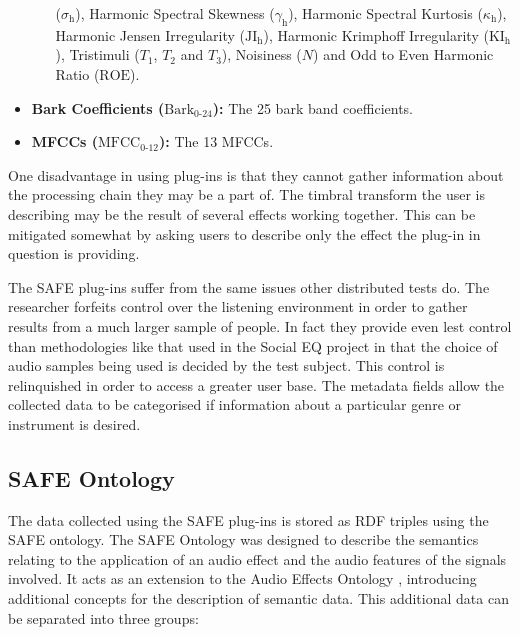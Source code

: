 \begin{itemize}
\begin{itemize}
				      ($\sigma_{\textrm{h}}$), Harmonic Spectral Skewness ($\gamma_{\textrm{h}}$), Harmonic
				      Spectral Kurtosis ($\kappa_{\textrm{h}}$), Harmonic Jensen Irregularity
				      ($\textrm{JI}_{\textrm{h}}$), Harmonic Krimphoff Irregularity
				      ($\textrm{KI}_{\textrm{h}}$), Tristimuli ($T_{1}$, $T_{2}$ and $T_{3}$), Noisiness
				      ($N$) and Odd to Even Harmonic Ratio ($\textrm{ROE}$).
			\end{itemize}
			\item {\bf{Bark Coefficients (}}$\textrm{Bark}_{0\textrm{-}24}${\bf{):}} The 25 bark band
			      coefficients.
			\item {\bf{MFCCs (}}$\textrm{MFCC}_{0\textrm{-}12}${\bf{):}} The 13 MFCCs.
		\end{itemize}

		One disadvantage in using plug-ins is that they cannot gather information about the processing chain they
		may be a part of. The timbral transform the user is describing may be the result of several effects working
		together. This can be mitigated somewhat by asking users to describe only the effect the plug-in in
		question is providing.

		The SAFE plug-ins suffer from the same issues other distributed tests do. The researcher forfeits control
		over the listening environment in order to gather results from a much larger sample of people. In fact they
		provide even lest control than methodologies like that used in the Social EQ project
		\citep{cartwright2013socialeq} in that the choice of audio samples being used is decided by the test
		subject. This control is relinquished in order to access a greater user base. The metadata fields allow the
		collected data to be categorised if information about a particular genre or instrument is desired.


	\subsection{SAFE Ontology}
	\label{sec:TimbreEvaluation-DAWBasedTimbreEvaluation-SAFEOntology}
		The data collected using the SAFE plug-ins is stored as RDF triples using the SAFE ontology.  The SAFE
		Ontology was designed to describe the semantics relating to the application of an audio effect and the
		audio features of the signals involved. It acts as an extension to the Audio Effects Ontology
		\citep{wilmering2013the}, introducing additional concepts for the description of semantic data.  This
		additional data can be separated into three groups:

